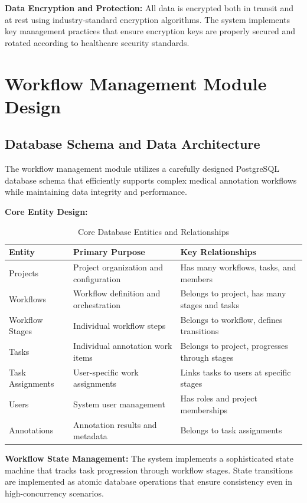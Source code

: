 \textbf{Data Encryption and Protection:} All data is encrypted both in transit and at rest using industry-standard encryption algorithms. The system implements key management practices that ensure encryption keys are properly secured and rotated according to healthcare security standards.

\section{Workflow Management Module Design}

\subsection{Database Schema and Data Architecture}

The workflow management module utilizes a carefully designed PostgreSQL database schema that efficiently supports complex medical annotation workflows while maintaining data integrity and performance.

\textbf{Core Entity Design:}

\begin{table}[htbp]
\centering
\caption{Core Database Entities and Relationships}
\label{tab:database-entities}
\begin{tabular}{|p{3cm}|p{4cm}|p{7cm}|}
\hline
\textbf{Entity} & \textbf{Primary Purpose} & \textbf{Key Relationships} \\
\hline
Projects & Project organization and configuration & Has many workflows, tasks, and members \\
\hline
Workflows & Workflow definition and orchestration & Belongs to project, has many stages and tasks \\
\hline
Workflow Stages & Individual workflow steps & Belongs to workflow, defines transitions \\
\hline
Tasks & Individual annotation work items & Belongs to project, progresses through stages \\
\hline
Task Assignments & User-specific work assignments & Links tasks to users at specific stages \\
\hline
Users & System user management & Has roles and project memberships \\
\hline
Annotations & Annotation results and metadata & Belongs to task assignments \\
\hline
\end{tabular}
\end{table}

\textbf{Workflow State Management:} The system implements a sophisticated state machine that tracks task progression through workflow stages. State transitions are implemented as atomic database operations that ensure consistency even in high-concurrency scenarios.


